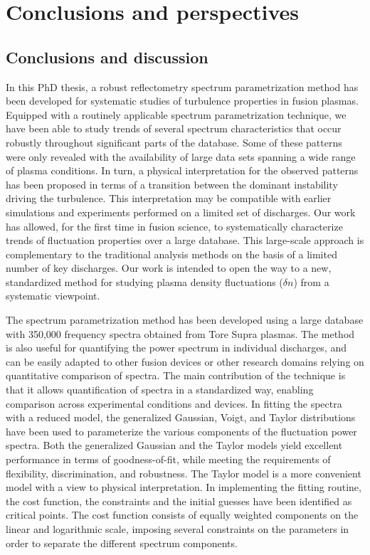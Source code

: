 
\chapter{Conclusions and perspectives} \label{summmary}
\graphicspath{{chapter7_ys/}}


\section{Conclusions and discussion}

In this PhD thesis, a robust reflectometry spectrum parametrization method has been developed for systematic studies of turbulence properties in fusion plasmas. Equipped with a routinely applicable spectrum parametrization technique, we have been able to study trends of several spectrum characteristics that occur robustly throughout significant parts of the database. Some of these patterns were only revealed with the availability of large data sets spanning a wide range of plasma conditions. In turn, a physical interpretation for the observed patterns has been proposed in terms of a transition between the dominant instability driving the turbulence. This interpretation may be compatible with earlier simulations and experiments performed on a limited set of discharges. Our work has allowed, for the first time in fusion science, to systematically characterize trends of fluctuation properties over a large database. This large-scale approach is complementary to the traditional analysis methods on the basis of a limited number of key discharges. Our work is intended to open the way to a new, standardized method for studying plasma density fluctuations ($\delta n$) from a systematic viewpoint.

The spectrum parametrization method has been developed using a large database with 350,000 frequency spectra obtained from Tore Supra plasmas. The method is also useful for quantifying the power spectrum in individual discharges, and can be easily adapted to other fusion devices or other research domains relying on quantitative comparison of spectra. The main contribution of the technique is that it allows quantification of spectra in a standardized way, enabling comparison across experimental conditions and devices. In fitting the spectra with a reduced model, the generalized Gaussian, Voigt, and Taylor distributions have been used to parameterize the various components of the fluctuation power spectra. Both the generalized Gaussian and the Taylor models yield excellent performance in terms of goodness-of-fit, while meeting the requirements of flexibility, discrimination, and robustness. The Taylor model is a more convenient model with a view to physical interpretation. In implementing the fitting routine, the cost function, the constraints and the initial guesses have been identified as critical points. The cost function consists of equally weighted components on the linear and logarithmic scale, imposing several constraints on the parameters in order to separate the different spectrum components.

